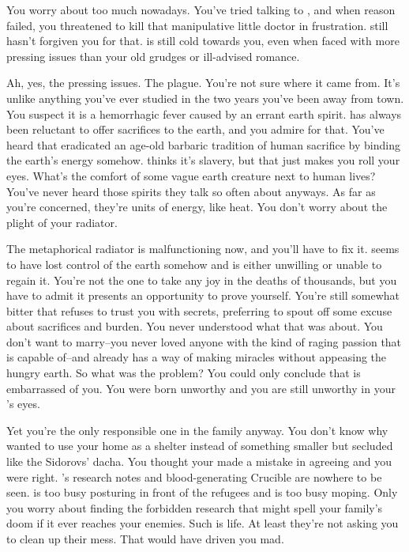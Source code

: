 \documentclass[char]{Pestilence}
\begin{document}
You worry about \cRebel{} too much nowadays. You've tried talking to \cRebel{\them}, and when reason failed, you threatened to kill that manipulative little doctor in frustration. \cRebel{} still hasn't forgiven you for that. \cRebel{\They} is still cold towards you, even when faced with more pressing issues than your old grudges or \cRebel{\their} ill-advised romance.

Ah, yes, the pressing issues. The plague. You're not sure where it came from. It's unlike anything you've ever studied in the two years you've been away from town. You suspect it is a hemorrhagic fever caused by an errant earth spirit. \cElder{\Parent} has always been reluctant to offer sacrifices to the earth, and you admire \cElder{\them} for that. You've heard that \cElder{\they} eradicated an age-old barbaric tradition of human sacrifice by binding the earth's energy somehow. \cRebel{} thinks it's slavery, but that just makes you roll your eyes. What's the comfort of some vague earth creature next to human lives? You've never heard those spirits they talk so often about anyways. As far as you're concerned, they're units of energy, like heat. You don't worry about the plight of your radiator. 

The metaphorical radiator is malfunctioning now, and you'll have to fix it. \cElder{\Parent} seems to have lost control of the earth somehow and is either unwilling or unable to regain it. You're not the one to take any joy in the deaths of thousands, but you have to admit it presents an opportunity to prove yourself. You're still somewhat bitter that \cElder{\Parent} refuses to trust you with \cElder{\their} secrets, preferring to spout off some excuse about sacrifices and burden. You never understood what that was about. You don't want to marry--you never loved anyone with the kind of raging passion that \cRebel{} is capable of--and \cElder{\Parent} already has a way of making miracles without appeasing the hungry earth. So what was the problem? You could only conclude that \cElder{\Parent} is embarrassed of you. You were born unworthy and you are still unworthy in your \cElder{\parent}'s eyes.

Yet you're the only responsible one in the family anyway. You don't know why \cOutsider{} wanted to use your home as a shelter instead of something smaller but secluded like the Sidorovs' dacha. You thought your \cElder{\parent} made a mistake in agreeing and you were right. \cRebel{}'s research notes and blood-generating Crucible are nowhere to be seen. \cElder{\Parent} is too busy posturing in front of the refugees and \cRebel{} is too busy moping. Only you worry about finding the forbidden research that might spell your family's doom if it ever reaches your enemies. Such is life. At least they're not asking you to clean up their mess. That would have driven you mad.
\end{document}
